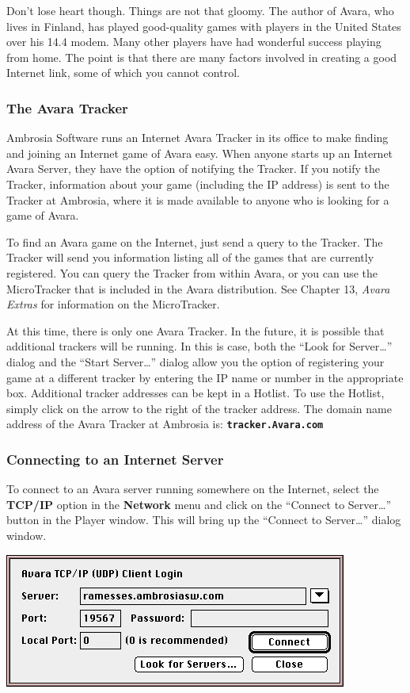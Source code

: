 \documentclass{article}
\begin{document}
Don't lose heart though. Things are not that gloomy. The author of Avara, who lives in Finland, has played good-quality games with players in the United States over his 14.4 modem. Many other players have had wonderful success playing from home. The point is that there are many factors involved in creating a good Internet link, some of which you cannot control.

\subsubsection{The Avara Tracker}
Ambrosia Software runs an Internet Avara Tracker in its office to make finding and joining an Internet game of Avara easy. When anyone starts up an Internet Avara Server, they have the option of notifying the Tracker. If you notify the Tracker, information about your game (including the IP address) is sent to the Tracker at Ambrosia, where it is made available to anyone who is looking for a game of Avara.

To find an Avara game on the Internet, just send a query to the Tracker. The Tracker will send you information listing all of the games that are currently registered. You can query the Tracker from within Avara, or you can use the MicroTracker that is included in the Avara distribution. See Chapter 13, \textit{Avara Extras} for information on the MicroTracker.

At this time, there is only one Avara Tracker. In the future, it is possible that additional trackers will be running. In this is case, both the ``Look for Server\dots'' dialog and the ``Start Server\dots'' dialog allow you the option of registering your game at a different tracker by entering the IP name or number in the appropriate box. Additional tracker addresses can be kept in a Hotlist. To use the Hotlist, simply click on the arrow to the right of the tracker address. The domain name address of the Avara Tracker at Ambrosia is: \textbf{\texttt{tracker.Avara.com}}

\subsubsection{Connecting to an Internet Server}
To connect to an Avara server running somewhere on the Internet, select the \textbf{TCP/IP} option in the \textbf{Network} menu and click on the ``Connect to Server\dots'' button in the Player window. This will bring up the ``Connect to Server\dots'' dialog window.

\begin{center}
	\includegraphics{img/21.png}
\end{center}
\end{document}
